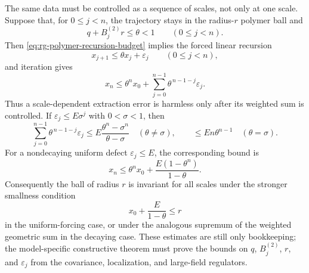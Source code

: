 The same data must be controlled as a sequence of scales, not only at one
scale.  Suppose that, for \(0\leq j<n\), the trajectory stays in the
radius-\(r\) polymer ball and
\[
  q+B^{(2)}_jr\leq\theta<1
  \qquad (0\leq j<n).
\]
Then \eqref{eq:rg-polymer-recursion-budget} implies the forced linear
recursion
\[
  x_{j+1}\leq \theta x_j+\varepsilon_j
  \qquad (0\leq j<n),
\]
and iteration gives
\begin{equation}
  x_n
  \leq
  \theta^n x_0+
  \sum_{j=0}^{n-1}\theta^{\,n-1-j}\varepsilon_j .
  \label{eq:rg-polymer-multiscale-forcing-bound}
\end{equation}
Thus a scale-dependent extraction error is harmless only after its weighted
sum is controlled.  If
\(\varepsilon_j\leq E\sigma^j\) with \(0<\sigma<1\), then
\begin{equation}
  \sum_{j=0}^{n-1}\theta^{\,n-1-j}\varepsilon_j
  \leq
  E\frac{\theta^n-\sigma^n}{\theta-\sigma}
  \quad(\theta\neq\sigma),
  \qquad
  \leq En\theta^{n-1}
  \quad(\theta=\sigma).
  \label{eq:rg-polymer-geometric-forcing-bound}
\end{equation}
For a nondecaying uniform defect \(\varepsilon_j\leq E\), the corresponding
bound is
\[
  x_n\leq\theta^nx_0+\frac{E(1-\theta^n)}{1-\theta}.
\]
Consequently the ball of radius \(r\) is invariant for all scales under the
stronger smallness condition
\begin{equation}
  x_0+\frac{E}{1-\theta}\leq r
  \label{eq:rg-polymer-uniform-forcing-invariant-ball}
\end{equation}
in the uniform-forcing case, or under the analogous supremum of the weighted
geometric sum in the decaying case.  These estimates are still only
bookkeeping; the model-specific constructive theorem must prove the bounds
on \(q\), \(B^{(2)}_j\), \(r\), and \(\varepsilon_j\) from the covariance,
localization, and large-field regulators.

